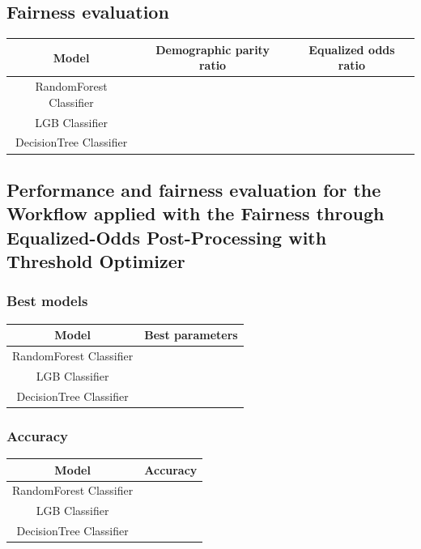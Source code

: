 \documentclass[12pt,a4paper,openright,twoside]{book}
\begin{document}
\subsection{Fairness evaluation}

\begin{tabular}{|c|c|c|}
    \hline
    \textbf{Model} & \textbf{Demographic parity ratio} & \textbf{Equalized odds ratio} \\
    \hline
    RandomForest Classifier & & \\
    \hline
    LGB Classifier & & \\
    \hline
    DecisionTree Classifier & & \\
    \hline
\end{tabular}

\subsection{Performance and fairness evaluation for the Workflow applied with the Fairness through Equalized-Odds Post-Processing with Threshold Optimizer}

\subsubsection{Best models}

\begin{tabular}{|c|c|}
    \hline
    \textbf{Model} & \textbf{Best parameters} \\
    \hline
    RandomForest Classifier  &  \\
    \hline
    LGB Classifier & \\
    \hline
    DecisionTree Classifier & \\
    \hline
\end{tabular}

\subsubsection{Accuracy}

\begin{tabular}{|c|c|}
    \hline
    \textbf{Model} & \textbf{Accuracy} \\ 
    \hline
    RandomForest Classifier  &  \\
    \hline
    LGB Classifier & \\
    \hline
    DecisionTree Classifier & \\ 
    \hline
\end{tabular}
\end{document}
